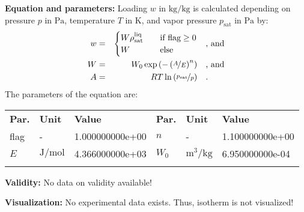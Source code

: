 \textbf{Equation and parameters:}
\newline
%
Loading $w$ in $\si{\kilogram\per\kilogram}$ is calculated depending on pressure $p$ in $\si{\pascal}$, temperature $T$ in $\si{\kelvin}$, and vapor pressure $p_\mathrm{sat}$ in $\si{\pascal}$ by:
%
\begin{equation*}
\begin{split}
w &=& \begin{cases} W \rho_\mathrm{sat}^{\mathrm{liq}} & \quad \text{if flag} \geq 0 \\ W & \quad \text{else} \end{cases} & \quad\text{, and} \\
W &=& W_0 \exp \left( - \left( \nicefrac{A}{E} \right) ^{n} \right) & \quad\text{, and} \\
A &=& R T \ln \left( \nicefrac{p_\mathrm{sat}}{p} \right) & \quad\text{.} \\
\end{split}
\end{equation*}
%
The parameters of the equation are:
%
\begin{longtable}[l]{lll|lll}
\toprule
\addlinespace
\textbf{Par.} & \textbf{Unit} & \textbf{Value} &	\textbf{Par.} & \textbf{Unit} & \textbf{Value} \\
\addlinespace
\midrule
\endhead

\bottomrule
\endfoot
\bottomrule
\endlastfoot
\addlinespace

flag & - & 1.000000000e+00 & $n$ & - & 1.100000000e+00 \\
$E$ & $\si{\joule\per\mole}$ & 4.366000000e+03 & $W_0$ & $\si{\cubic\meter\per\kilogram}$ & 6.950000000e-04 \\

\addlinespace\end{longtable}

\textbf{Validity:}
\newline
No data on validity available!
\newline

\textbf{Visualization:}
%
\newline
No experimental data exists. Thus, isotherm is not visualized!
%

\FloatBarrier
\newpage
